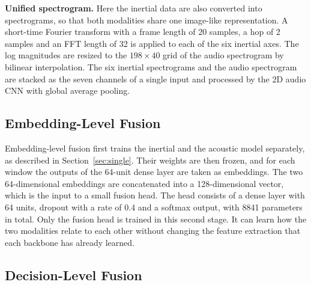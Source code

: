 \textbf{Unified spectrogram.} Here the inertial data are also converted into
spectrograms, so that both modalities share one image-like representation. A
short-time Fourier transform with a frame length of 20 samples, a hop of 2
samples and an FFT length of 32 is applied to each of the six inertial axes. The
log magnitudes are resized to the $198 \times 40$ grid of the audio spectrogram
by bilinear interpolation. The six inertial spectrograms and the audio
spectrogram are stacked as the seven channels of a single input and processed by
the 2D audio CNN with global average pooling.

\subsection{Embedding-Level Fusion}
\label{sec:embedding-fusion}

Embedding-level fusion first trains the inertial and the acoustic model
separately, as described in Section~\ref{sec:single}. Their weights are then
frozen, and for each window the outputs of the 64-unit dense layer are taken as
embeddings. The two 64-dimensional embeddings are concatenated into a
128-dimensional vector, which is the input to a small fusion head. The head
consists of a dense layer with 64 units, dropout with a rate of 0.4 and a softmax
output, with 8841 parameters in total.
Only the fusion head is trained in this second stage. It can learn how the two
modalities relate to each other without changing the feature extraction that each
backbone has already learned.

\subsection{Decision-Level Fusion}
\label{sec:decision-fusion}

